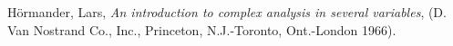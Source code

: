 \documentclass[a4paper,11pt]{article}
\theoremstyle{remark}
\begin{document}
\begin{thebibliography}{10}

{\sc H\"ormander, Lars},
{\it An introduction to complex analysis in several variables}, 
(D. Van Nostrand Co., Inc., Princeton, N.J.-Toronto, Ont.-London 1966).
	


% 
% 
% 
% 
% 
% 
% 
% 
% 
% 
% 

\end{thebibliography}
\end{document}

